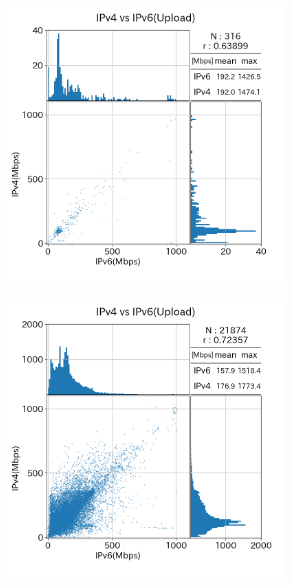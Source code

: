 \begin{figure}[htbp]
\begin{center}
\begin{minipage}[t]{0.48\textwidth}
\begin{center}
\begin{subfigure}[b]{\textwidth}
                    \label{old_mix_ul}
                \end{subfigure}
                \begin{subfigure}[b]{\textwidth}
                    \centering
                    \includegraphics[width=0.8\textwidth]{fig/old_PPPoE_ul.png}
                    \label{old_PPPoE_ul}
                \end{subfigure}
            \caption{(1)のアップロードのスループット}
            \label{fig:old_connect_ul}
            \end{center}
        \end{minipage}
        \hfill
        \begin{minipage}[t]{0.48\textwidth}
            \begin{subfigure}[b]{\textwidth}
                \centering
                \includegraphics[width=0.8\textwidth]{fig/new_IPv4aaS_ul.png}

\end{subfigure}
\end{minipage}
\end{center}
\end{figure}
